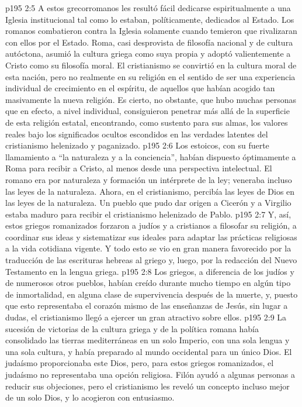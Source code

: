 \vs p195 2:5 A estos grecorromanos les resultó fácil dedicarse espiritualmente a una Iglesia institucional tal como lo estaban, políticamente, dedicados al Estado. Los romanos combatieron contra la Iglesia solamente cuando temieron que rivalizaran con ellos por el Estado. Roma, casi desprovista de filosofía nacional y de cultura autóctona, asumió la cultura griega como suya propia y adoptó valientemente a Cristo como su filosofía moral. El cristianismo se convirtió en la cultura moral de esta nación, pero no realmente en su religión en el sentido de ser una experiencia individual de crecimiento en el espíritu, de aquellos que habían acogido tan masivamente la nueva religión. Es cierto, no obstante, que hubo muchas personas que en efecto, a nivel individual, consiguieron penetrar más allá de la superficie de esta religión estatal, encontrando, como sustento para sus almas, los valores reales bajo los significados ocultos escondidos en las verdades latentes del cristianismo helenizado y paganizado.
\vs p195 2:6 \pc Los estoicos, con su fuerte llamamiento a “la naturaleza y a la conciencia”, habían dispuesto óptimamente a Roma para recibir a Cristo, al menos desde una perspectiva intelectual. El romano era por naturaleza y formación un intérprete de la ley; veneraba incluso las leyes de la naturaleza. Ahora, en el cristianismo, percibía las leyes de Dios en las leyes de la naturaleza. Un pueblo que pudo dar origen a Cicerón y a Virgilio estaba maduro para recibir el cristianismo helenizado de Pablo.
\vs p195 2:7 Y, así, estos griegos romanizados forzaron a judíos y a cristianos a filosofar su religión, a coordinar sus ideas y sistematizar sus ideales para adaptar las prácticas religiosas a la vida cotidiana vigente. Y todo esto se vio en gran manera favorecido por la traducción de las escrituras hebreas al griego y, luego, por la redacción del Nuevo Testamento en la lengua griega.
\vs p195 2:8 Los griegos, a diferencia de los judíos y de numerosos otros pueblos, habían creído durante mucho tiempo en algún tipo de inmortalidad, en alguna clase de supervivencia después de la muerte, y, puesto que esto representaba el corazón mismo de las enseñanzas de Jesús, sin lugar a dudas, el cristianismo llegó a ejercer un gran atractivo sobre ellos.
\vs p195 2:9 La sucesión de victorias de la cultura griega y de la política romana había consolidado las tierras mediterráneas en un solo Imperio, con una sola lengua y una sola cultura, y había preparado al mundo occidental para un único Dios. El judaísmo proporcionaba este Dios, pero, para estos griegos romanizados, el judaísmo no representaba una opción religiosa. Filón ayudó a algunas personas a reducir sus objeciones, pero el cristianismo les reveló un concepto incluso mejor de un solo Dios, y lo acogieron con entusiasmo.
